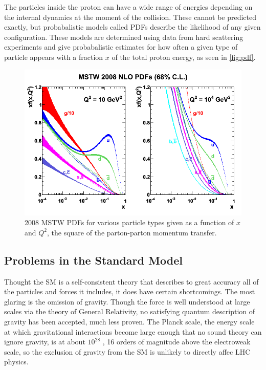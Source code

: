 The particles inside the proton can have a wide range of energies depending on the internal dynamics at the moment of the collision. These cannot be predicted exactly, but probabalistic models called \acfp{PDF} describe the likelihood of any given configuration. These models are determined using data from hard scattering experiments and give probabalistic estimates for how often a given type of particle appears with a fraction $x$ of the total proton energy, as seen in \autoref{fig:pdf}. 

\begin{centering}
\begin{figure}[bth]
\myfloatalign
\includegraphics[width=.85\linewidth]{figures/theory/mstw2008nlo68cl_allpdfs.png}
\caption{2008 MSTW \acp{PDF} for various particle types given as a function of $x$ and $Q^2$, the square of the parton-parton momentum transfer. \cite{0901.0002}}
\label{fig:pdf}
\end{figure}
\end{centering}




\subsection{Problems in the Standard Model}
\label{sec:sm_problems}

Thought the \ac{SM} is a self-consistent theory that describes to great accuracy all of the particles and forces it includes, it does have certain shortcomings. The most glaring is the omission of gravity. Though the force is well understood at large scales via the theory of General Relativity, no satisfying quantum description of gravity has been accepted, much less proven. The Planck scale, the energy scale at which gravitational interactions become large enough that no sound theory can ignore gravity, is at about $10^{28}$ \eV, 16 orders of magnitude above the electroweak scale, so the exclusion of gravity from the \ac{SM} is unlikely to directly affec \ac{LHC} physics. 

